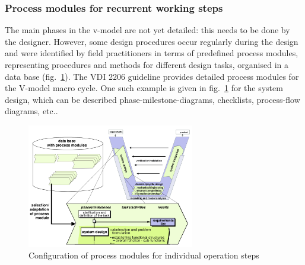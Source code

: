 \subsubsection{Process modules for recurrent working steps}
The main phases in the v-model are not yet detailed: this needs to be done by
the designer. However, some design procedures occur regularly during the design
and were identified by field practitioners in terms of predefined process
modules, representing procedures and methods for different design tasks,
organised in a data base
(fig.~\ref{fig:v-model-recurrent}\cite{gausemeier2003new}). The VDI 2206
guideline provides detailed process modules for the V-model macro cycle. One
such example is given in fig.~\ref{fig:v-model-recurrent} for the system design,
which can be described phase-milestone-diagrams, checklists, process-flow
diagrams, etc..

\begin{figure}[!hbt]
  \begin{center}
    \includegraphics[width=0.65\textwidth]{./img/v-model-recurrent.png}
  \end{center}
  \caption{Configuration of process modules for individual operation steps}
\label{fig:v-model-recurrent}
\end{figure}

